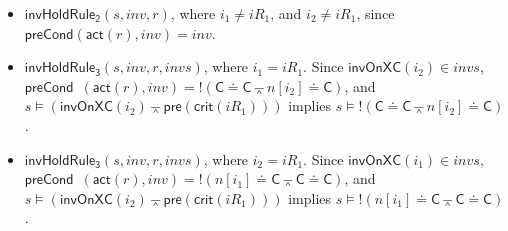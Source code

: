\documentclass[final]{IEEEtran}
\def \eqc {\doteq }
\def \andc {\barwedge }
\def \negc {!}
\begin{document}
\begin{example}
\begin{itemize}


\item     $\mathsf{invHoldRule_2 }(s,inv,r)$, where   $i_1 \neq iR_1$, and $i_2 \neq iR_1$, since $\mathsf{preCond}(\mathsf{act}(r),inv)=inv$.


 \item   $\mathsf{invHoldRule_3 }(s,inv,r,invs)$, where  $i_1 = iR_1$.
  Since
 $\mathsf{invOnXC}( i_2) \in invs$, $\mathsf{preCond}$\ $(\mathsf{act}(r),inv)=\negc (\mathsf{C}\eqc\mathsf{C}\andc n[i_2]\eqc\mathsf{C})$, and $s \models (\mathsf{invOnXC}( i_2) \andc \mathsf{pre}(\mathsf{crit}(iR_1)))$ implies  $s \models \negc (\mathsf{C}\eqc\mathsf{C}\andc n[i_2]\eqc\mathsf{C})$.


\item   $\mathsf{invHoldRule_3 }(s,inv,r,invs)$, where $i_2 = iR_1$.  Since
 $\mathsf{invOnXC}( i_1) \in invs$, $\mathsf{preCond}$\ $(\mathsf{act}(r),inv)=\negc (n[i_1]\eqc\mathsf{C}\andc \mathsf{C}\eqc\mathsf{C})$, and $s \models (\mathsf{invOnXC}( i_2) \andc \mathsf{pre}(\mathsf{crit}(iR_1)))$ implies  $s \models \negc ( n[i_1]\eqc\mathsf{C}\andc \mathsf{C}\eqc\mathsf{C})$. %
 \end{itemize}
\end{example}
\end{document}

